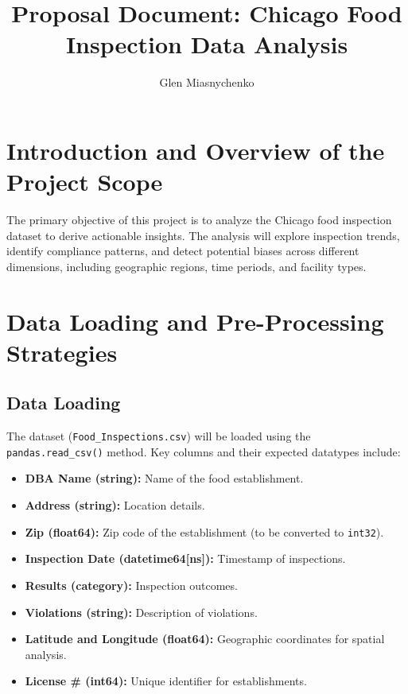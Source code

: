 \documentclass[12pt]{article}
\title{Proposal Document: Chicago Food Inspection Data Analysis}
\author{Glen Miasnychenko}
\date{}
\begin{document}
\maketitle

\section*{Introduction and Overview of the Project Scope}

\hspace*{2em}The primary objective of this project is to analyze the Chicago food inspection dataset to derive actionable insights.
The analysis will explore inspection trends, identify compliance patterns, and detect potential biases across different
dimensions, including geographic regions, time periods, and facility types.

\section*{Data Loading and Pre-Processing Strategies}

\subsection*{Data Loading}
The dataset (\texttt{Food\_Inspections.csv}) will be loaded using the \texttt{pandas.read\_csv()} method.
Key columns and their expected datatypes include:
\begin{itemize}
    \item \textbf{DBA Name (string):} Name of the food establishment.
    \item \textbf{Address (string):} Location details.
    \item \textbf{Zip (float64):} Zip code of the establishment (to be converted to \texttt{int32}).
    \item \textbf{Inspection Date (datetime64[ns]):} Timestamp of inspections.
    \item \textbf{Results (category):} Inspection outcomes.
    \item \textbf{Violations (string):} Description of violations.
    \item \textbf{Latitude and Longitude (float64):} Geographic coordinates for spatial analysis.
    \item \textbf{License \# (int64):} Unique identifier for establishments.
\end{itemize}
\end{document}
